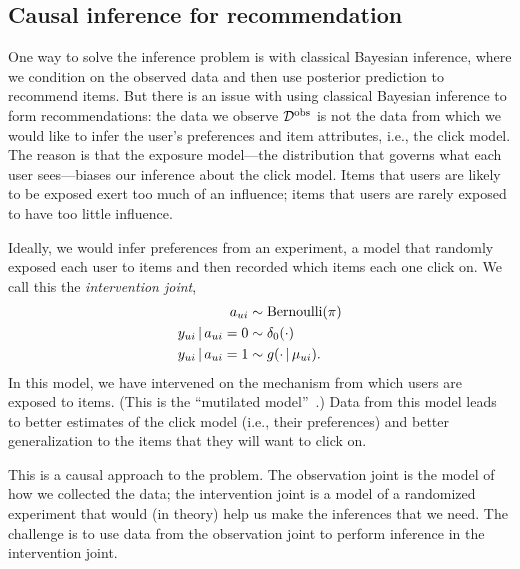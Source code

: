 
\subsection{Causal inference for recommendation} 

One way to solve the
inference problem is with classical Bayesian inference, where we
condition on the observed data and then use posterior prediction to
recommend items.  But there is an issue with using classical Bayesian
inference to form recommendations: the data we observe $\mathcal{D}^{\textrm{obs}}$ is not
the data from which we would like to infer the user's preferences and
item attributes, i.e., the click model. The reason is that the
exposure model---the distribution that governs what each user
sees---biases our inference about the click model. Items that users
are likely to be exposed exert too much of an influence; items that
users are rarely exposed to have too little influence.

Ideally, we would infer preferences from an experiment, a model that
randomly exposed each user to items and then recorded which items each
one click on.  We call this the \textit{intervention joint},
\begin{align*}
  a_{ui} & \sim \mathrm{Bernoulli}(\pi) \\
  y_{ui} \,\vert\, a_{ui}=0 & \sim \delta_{0}(\cdot) \\
  y_{ui} \,\vert\, a_{ui}=1 & \sim g(\cdot \,\vert\, \mu_{ui}).
\end{align*}
In this model, we have intervened on the mechanism from which users
are exposed to items. (This is the ``mutilated
model''~\citep{pearl2009causality}.) Data from this model leads to
better estimates of the click model (i.e., their preferences) and
better generalization to the items that they will want to click on.

This is a causal approach to the problem.  The observation joint is
the model of how we collected the data; the intervention joint is a
model of a randomized experiment that would (in theory) help us make
the inferences that we need.  The challenge is to use data from the
observation joint to perform inference in the intervention joint.




